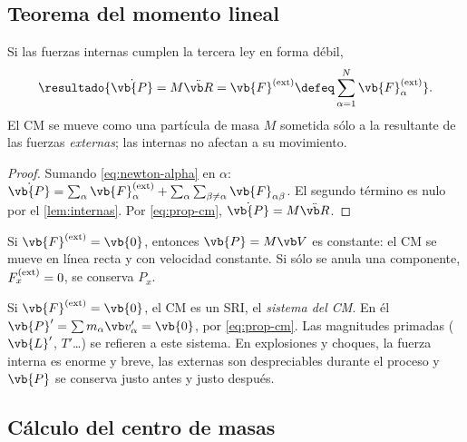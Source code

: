 \subsection{Teorema del momento lineal}

\begin{teorema}
\label{teo:momento-lineal}
Si las fuerzas internas cumplen la tercera ley en forma débil,
\begin{equation}
  \resultado{\dot{\vb{P}}=M\ddot{\Rc}=\vb{F}\ext\defeq\sa\vb{F}_{\alpha}\ext} .
  \label{eq:momento-lineal}
\end{equation}
El CM se mueve como una partícula de masa $M$ sometida sólo a la resultante
de las fuerzas \emph{externas}; las internas no afectan a su movimiento.
\end{teorema}

\begin{proof}
Sumando \eqref{eq:newton-alpha} en $\alpha$:
$\dot{\vb{P}}=\sum_{\alpha}\vb{F}_{\alpha}\ext+\sum_{\alpha}\sum_{\beta\neq\alpha}\vb{F}_{\alpha\beta}$. El
segundo término es nulo por el \cref{lem:internas}. Por \eqref{eq:prop-cm},
$\dot{\vb{P}}=M\ddot{\Rc}$.
\end{proof}

\begin{corolario}
\label{cor:conserva-P}
Si $\vb{F}\ext=\vb{0}$, entonces $\vb{P}=M\Vc$ es constante: el CM se mueve en
línea recta y con velocidad constante. Si sólo se anula una componente,
$F^{(\mathrm{ext})}_{x}=0$, se conserva $P_{x}$.
\end{corolario}

\begin{observacion}
Si $\vb{F}\ext=\vb{0}$, el CM es un SRI, el \emph{sistema del CM}. En él
$\vb{P}'=\sum m_{\alpha}\vp_{\alpha}=\vb{0}$, por \eqref{eq:prop-cm}. Las magnitudes primadas
($\vb{L}'$, $T'$\dots) se refieren a este sistema. En explosiones y choques, la
fuerza interna es enorme y breve, las externas son despreciables durante el
proceso y $\vb{P}$ se conserva justo antes y justo después.
\end{observacion}

\subsection{Cálculo del centro de masas}

